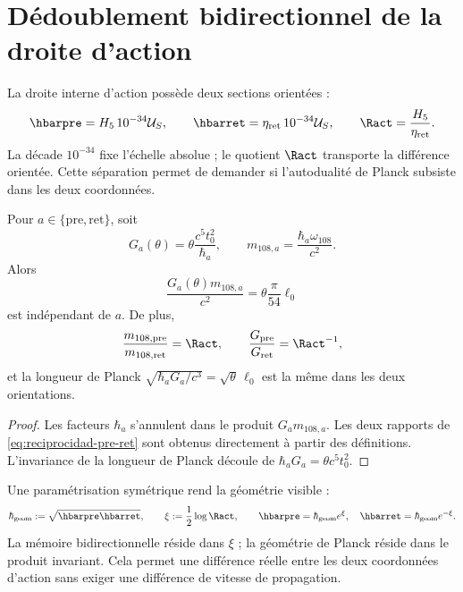 \section{Dédoublement bidirectionnel de la droite d’action}

La droite interne d’action possède deux sections orientées :
\begin{equation}
\hbarpre=H_5\,10^{-34}\mathcal U_S,
\qquad
\hbarret=\eta_{\mathrm{ret}}\,10^{-34}\mathcal U_S,
\qquad
\Ract=\frac{H_5}{\eta_{\mathrm{ret}}}.
\label{eq:hbar-pre-ret-anexo}
\end{equation}
La décade \(10^{-34}\) fixe l’échelle absolue ; le quotient \(\Ract\)
transporte la différence orientée. Cette séparation permet de demander si
l’autodualité de Planck subsiste dans les deux coordonnées.

\begin{theorem}
\label{thm:accion-gravedad-reciproca}
Pour \(a\in\{\mathrm{pre},\mathrm{ret}\}\), soit
\[
G_a(\theta)=\theta\frac{c^5t_0^2}{\hbar_a},
\qquad
m_{108,a}=\frac{\hbar_a\omega_{108}}{c^2}.
\]
Alors
\begin{equation}
\frac{G_a(\theta)m_{108,a}}{c^2}
=\theta\frac{\pi}{54}\ell_0
\label{eq:invariante-pre-ret-planck}
\end{equation}
est indépendant de \(a\). De plus,
\begin{equation}
\frac{m_{108,\mathrm{pre}}}{m_{108,\mathrm{ret}}}=\Ract,
\qquad
\frac{G_{\mathrm{pre}}}{G_{\mathrm{ret}}}=\Ract^{-1},
\label{eq:reciprocidad-pre-ret}
\end{equation}
et la longueur de Planck
\(\sqrt{\hbar_aG_a/c^3}=\sqrt\theta\,\ell_0\) est la même dans les deux
orientations.
\end{theorem}

\begin{proof}
Les facteurs \(\hbar_a\) s’annulent dans le produit \(G_am_{108,a}\).
Les deux rapports de \eqref{eq:reciprocidad-pre-ret} sont obtenus directement
à partir des définitions. L’invariance de la longueur de Planck découle de
\(\hbar_aG_a=\theta c^5t_0^2\).
\end{proof}

Une paramétrisation symétrique rend la géométrie visible :
\begin{equation}
\hbar_{\mathrm{geom}}:=\sqrt{\hbarpre\hbarret},
\qquad
\xi:=\frac12\log\Ract,
\qquad
\hbarpre=\hbar_{\mathrm{geom}}e^\xi,
\quad
\hbarret=\hbar_{\mathrm{geom}}e^{-\xi}.
\label{eq:rapidez-accion-pre-ret}
\end{equation}
La mémoire bidirectionnelle réside dans \(\xi\) ; la géométrie de Planck
réside dans le produit invariant. Cela permet une différence réelle entre les
deux coordonnées d’action sans exiger une différence de vitesse de
propagation.

